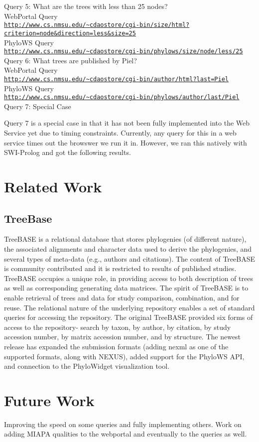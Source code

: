 \documentclass[10pt]{article}
\begin{document}
Query 5: What are the trees with less than 25 nodes?\\
 WebPortal Query \\
{\tt \url{http://www.cs.nmsu.edu/~cdaostore/cgi-bin/size/html?criterion=node&direction=less&size=25}}
\\PhyloWS Query\\
{\tt \url{http://www.cs.nmsu.edu/~cdaostore/cgi-bin/phylows/size/node/less/25}}
\\

Query 6: What trees are published by Piel?\\
 WebPortal Query \\
{\tt \url{http://www.cs.nmsu.edu/~cdaostore/cgi-bin/author/html?last=Piel}}
\\PhyloWS Query\\
{\tt \url{http://www.cs.nmsu.edu/~cdaostore/cgi-bin/phylows/author/last/Piel}}
\\

Query 7:  Special Case

Query 7 is a special case in that it has not been fully implemented into the
Web Service yet due to timing constraints.  Currently, any query for this in a
web service times out the browswer we run it in.  However, we ran this natively
with SWI-Prolog and got the following results.

\section{Related Work}

\subsection{TreeBase}

TreeBASE \cite{treebase} is a relational database that stores phylogenies (of
different nature), the associated alignments and character data used to derive
the phylogenies, and several types of meta-data (e.g., authors and citations).
The content of TreeBASE is community contributed and it is restricted to
results of published studies. TreeBASE occupies a unique role, in providing
access to both description of trees as well as corresponding generating data
matrices.  The spirit of TreeBASE is to enable retrieval of trees and data for
study comparison, combination, and for reuse. The relational nature of the
underlying repository enables a set of standard queries for accessing the
repository. The original TreeBASE provided six forms of access to the
repository- search by taxon, by author, by citation, by study accession number,
by matrix accession number, and by structure.  The newest release has expanded
the submission formats (adding nexml as one of the supported formats, along
with NEXUS), added support for the PhyloWS API, and connection to the
PhyloWidget visualization tool.

\section{Future Work}

Improving the speed on some queries and fully implementing others.  Work on
adding MIAPA qualities to the webportal and eventually to the queries as well.


  
\end{document}
